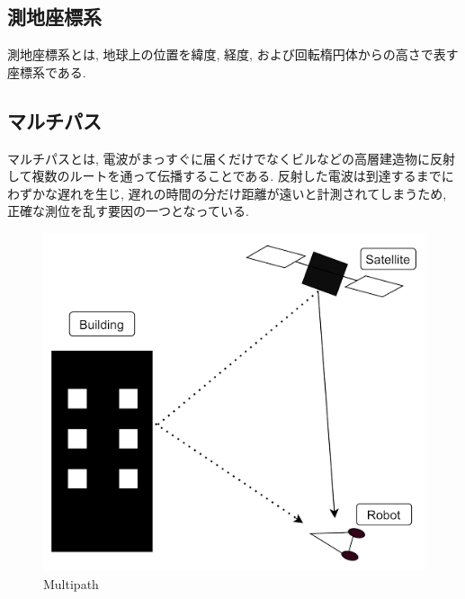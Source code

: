 \subsection{測地座標系}
測地座標系とは, 地球上の位置を緯度, 経度, および回転楕円体からの高さで表す座標系である.

\subsection{マルチパス}
マルチパスとは, 電波がまっすぐに届くだけでなくビルなどの高層建造物に反射して複数のルートを通って伝播することである.
反射した電波は到達するまでにわずかな遅れを生じ, 遅れの時間の分だけ距離が遠いと計測されてしまうため, 正確な測位を乱す要因の一つとなっている.

\begin{figure}[H]
  \centering
 \includegraphics[keepaspectratio, scale=0.6]
      {images/multipath.png}
 \caption{Multipath}
 \label{fig:multipath}
\end{figure}



